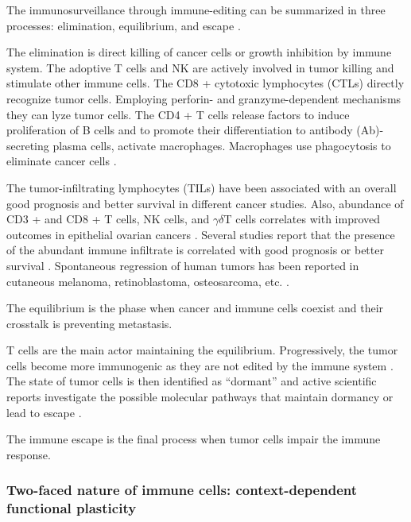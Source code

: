 \documentclass[12pt,]{book}
\theoremstyle{definition}
\theoremstyle{definition}
\theoremstyle{definition}
\theoremstyle{remark}
\begin{document}
The immunosurveillance through immune-editing can be summarized in three
processes: elimination, equilibrium, and escape \citep{Dunn2002}.

The elimination is direct killing of cancer cells or growth inhibition
by immune system. The adoptive T cells and NK are actively involved in
tumor killing and stimulate other immune cells. The CD8 + cytotoxic
lymphocytes (CTLs) directly recognize tumor cells. Employing perforin-
and granzyme-dependent mechanisms they can lyze tumor cells. The CD4 + T
cells release factors to induce proliferation of B cells and to promote
their differentiation to antibody (Ab)-secreting plasma cells, activate
macrophages. Macrophages use phagocytosis to eliminate cancer cells
\citep{Vesely2011}.

The tumor-infiltrating lymphocytes (TILs) have been associated with an
overall good prognosis and better survival in different cancer studies.
Also, abundance of CD3 + and CD8 + T cells, NK cells, and
\(\gamma\delta\)T cells correlates with improved outcomes in epithelial
ovarian cancers \citep{Marquez-Medina2012}. Several studies report that
the presence of the abundant immune infiltrate is correlated with good
prognosis or better survival
\citep{Kornstein1983, Baxevanis1994, Naito1998, Pages2005}. Spontaneous
regression of human tumors has been reported in cutaneous melanoma,
retinoblastoma, osteosarcoma, etc. \citep{Aris2012}.

The equilibrium is the phase when cancer and immune cells coexist and
their crosstalk is preventing metastasis.

T cells are the main actor maintaining the equilibrium. Progressively,
the tumor cells become more immunogenic as they are not edited by the
immune system \citep{Bahatia2011}. The state of tumor cells is then
identified as ``dormant'' and active scientific reports investigate the
possible molecular pathways that maintain dormancy or lead to escape
\citep{Teng2008}.

The immune escape is the final process when tumor cells impair the
immune response.

\hypertarget{two-faced-nature-of-immune-cells-context-dependent-functional-plasticity}{%
\subsubsection{Two-faced nature of immune cells: context-dependent
functional
plasticity}\label{two-faced-nature-of-immune-cells-context-dependent-functional-plasticity}}
\end{document}
